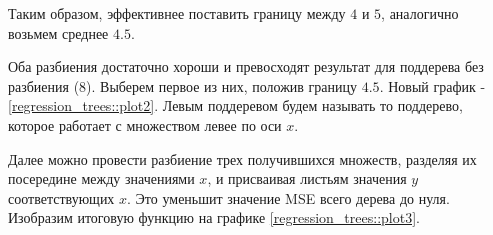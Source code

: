     Таким образом, эффективнее поставить границу между $4$ и $5$, аналогично возьмем среднее $4.5$.

    Оба разбиения достаточно хороши и превосходят результат для поддерева без разбиения ($8$). Выберем первое из них, положив границу $4.5$. Новый график - \ref{regression_trees::plot2}. Левым поддеревом будем называть то поддерево, которое работает с множеством левее по оси $x$.

    \begin{center}
    \end{center}

    Далее можно провести разбиение трех получившихся множеств, разделяя их посередине между значениями $x$, и присваивая листьям значения $y$ соответствующих $x$. Это уменьшит значение MSE всего дерева до нуля. Изобразим итоговую функцию на графике \ref{regression_trees::plot3}.

